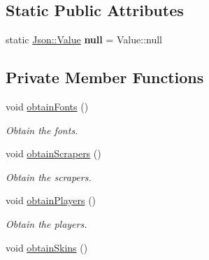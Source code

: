 \subsection*{Static Public Attributes}
\begin{DoxyCompactItemize}
\item 
\hypertarget{class_a_w_e_1_1_global_settings_a4df7847cd94fe68cf28382f70eedb0b2}{static \hyperlink{class_json_1_1_value}{Json\-::\-Value} {\bfseries null} = Value\-::null}\label{class_a_w_e_1_1_global_settings_a4df7847cd94fe68cf28382f70eedb0b2}

\end{DoxyCompactItemize}
\subsection*{Private Member Functions}
\begin{DoxyCompactItemize}
\item 
\hypertarget{class_a_w_e_1_1_global_settings_a05806b6ae429934ff964d36c8d1d88cb}{void \hyperlink{class_a_w_e_1_1_global_settings_a05806b6ae429934ff964d36c8d1d88cb}{obtain\-Fonts} ()}\label{class_a_w_e_1_1_global_settings_a05806b6ae429934ff964d36c8d1d88cb}

\begin{DoxyCompactList}\small\item\em Obtain the fonts. \end{DoxyCompactList}\item 
\hypertarget{class_a_w_e_1_1_global_settings_a3f1893c1c2fa7d268dc69576624d9adc}{void \hyperlink{class_a_w_e_1_1_global_settings_a3f1893c1c2fa7d268dc69576624d9adc}{obtain\-Scrapers} ()}\label{class_a_w_e_1_1_global_settings_a3f1893c1c2fa7d268dc69576624d9adc}

\begin{DoxyCompactList}\small\item\em Obtain the scrapers. \end{DoxyCompactList}\item 
\hypertarget{class_a_w_e_1_1_global_settings_a09bcd2ed0578f070b3f64df247822988}{void \hyperlink{class_a_w_e_1_1_global_settings_a09bcd2ed0578f070b3f64df247822988}{obtain\-Players} ()}\label{class_a_w_e_1_1_global_settings_a09bcd2ed0578f070b3f64df247822988}

\begin{DoxyCompactList}\small\item\em Obtain the players. \end{DoxyCompactList}\item 
\hypertarget{class_a_w_e_1_1_global_settings_ac178957248c6eab221aac7394d4a6bd7}{void \hyperlink{class_a_w_e_1_1_global_settings_ac178957248c6eab221aac7394d4a6bd7}{obtain\-Skins} ()}\label{class_a_w_e_1_1_global_settings_ac178957248c6eab221aac7394d4a6bd7}


\end{DoxyCompactItemize}
